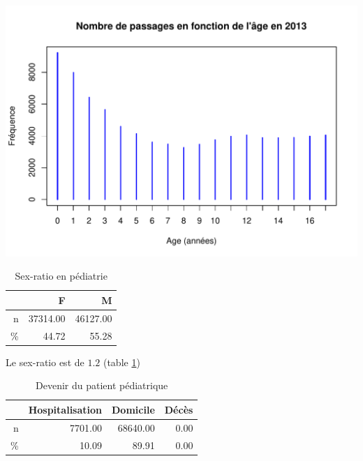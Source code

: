 \documentclass[12pt,english,french,twoside]{book}\usepackage[]{graphicx}\usepackage[]{color}
\makeatletter
\def\maxwidth{ %
  \ifdim\Gin@nat@width>\linewidth
    \linewidth
  \else
    \Gin@nat@width
  \fi
}
\newenvironment{knitrout}{}{} %
\makeatother
\begin{document}
\begin{knitrout}
\color{fgcolor}
\includegraphics[width=\maxwidth]{figure/passages_pediatrie} 

\end{knitrout}



\begin{table}[ht]
\centering
\begin{tabular}{rrr}
  \hline
 & F & M \\ 
  \hline
n & 37314.00 & 46127.00 \\ 
  \% & 44.72 & 55.28 \\ 
   \hline
\end{tabular}
\caption[Sex-ratio en pédiatrie]{Sex-ratio en pédiatrie} 
\label{tab:ped_sr}
\end{table}



Le sex-ratio est de $1.2$ (table \ref{tab:ped_sr})


\begin{table}[ht]
\centering
\begin{tabular}{rrrr}
  \hline
 & Hospitalisation & Domicile & Décès \\ 
  \hline
n & 7701.00 & 68640.00 & 0.00 \\ 
  \% & 10.09 & 89.91 & 0.00 \\ 
   \hline
\end{tabular}
\caption[Devenir du patient pédiatrique]{Devenir du patient pédiatrique} 
\label{tab:ped_hosp}
\end{table}
\end{document}
